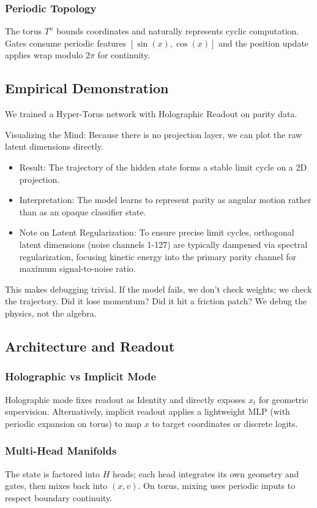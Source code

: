 \documentclass{article}
\numberwithin{equation}{section}
\begin{document}
\subsubsection{Periodic Topology}
The torus $T^n$ bounds coordinates and naturally represents cyclic computation. Gates consume periodic features $[\sin(x), \cos(x)]$ and the position update applies wrap modulo $2\pi$ for continuity.

\subsection{Empirical Demonstration}
We trained a Hyper-Torus network with Holographic Readout on parity data.

Visualizing the Mind:
Because there is no projection layer, we can plot the raw latent dimensions directly.
\begin{itemize}
\item Result: The trajectory of the hidden state forms a stable limit cycle on a 2D projection.
\item Interpretation: The model learns to represent parity as angular motion rather than as an opaque classifier state.
\item Note on Latent Regularization: To ensure precise limit cycles, orthogonal latent dimensions (noise channels 1-127) are typically dampened via spectral regularization, focusing kinetic energy into the primary parity channel for maximum signal-to-noise ratio.
\end{itemize}
This makes debugging trivial. If the model fails, we don't check weights; we check the trajectory. Did it lose momentum? Did it hit a friction patch? We debug the physics, not the algebra.

\subsection{Architecture and Readout}
\subsubsection{Holographic vs Implicit Mode}
Holographic mode fixes readout as Identity and directly exposes $x_t$ for geometric supervision. Alternatively, implicit readout applies a lightweight MLP (with periodic expansion on torus) to map $x$ to target coordinates or discrete logits.

\subsubsection{Multi-Head Manifolds}
The state is factored into $H$ heads; each head integrates its own geometry and gates, then mixes back into $(x, v)$. On torus, mixing uses periodic inputs to respect boundary continuity.
\end{document}
